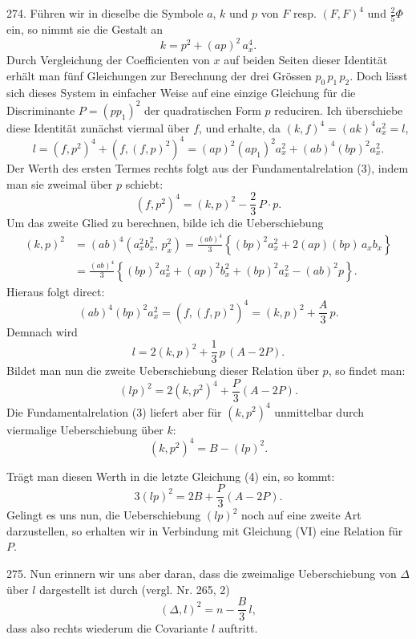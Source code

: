 \documentclass[11pt]{article}
\providecommand{\weberpage}[1]{}
\providecommand{\weq}[2]{\begin{equation}\tag{#1}#2\end{equation}}
\let\Delta\varDelta
\let\Phi\varPhi
\begin{document}
274. Führen wir in dieselbe die Symbole $a$, $k$ und $p$ von $F$ resp. $(F,F)^4$ und $\frac{2}{5}\Phi$ ein, so nimmt sie die Gestalt an
\weq{3}{
k = p^2 + (ap)^2\,a_x^4.
}
Durch Vergleichung der Coefficienten von $x$ auf beiden Seiten dieser Identität erhält man fünf Gleichungen zur Berechnung der drei Grössen $p_0\,p_1\,p_2$. Doch lässt sich dieses System in einfacher Weise auf eine einzige Gleichung für die Discriminante $P=(pp_1)^2$ der quadratischen Form $p$ reduciren. Ich überschiebe diese Identität zunächst viermal über $f$, und erhalte, da $(k,f)^4=(ak)^4 a_x^2=l$,
\[
l = (f,p^2)^4 + (f,(f,p)^2)^4 = (ap)^2(ap_1)^2 a_x^2 + (ab)^4(bp)^2 a_x^2.
\]
Der Werth des ersten Termes rechts folgt aus der Fundamentalrelation (3), indem man sie zweimal über $p$ schiebt:
\[
(f,p^2)^4 = (k,p)^2 - \frac{2}{3}\,P\cdot p.
\]
Um das zweite Glied zu berechnen, bilde ich die Ueberschiebung
\[
\begin{aligned}
(k,p)^2 &= (ab)^4(a_x^2 b_x^2,\, p_x^2) = \frac{(ab)^4}{3}\left\{ (bp)^2 a_x^2 + 2(ap)(bp)\,a_x b_x \right\} \\
&= \frac{(ab)^4}{3}\left\{ (bp)^2 a_x^2 + (ap)^2 b_x^2 + (bp)^2 a_x^2 - (ab)^2 p \right\}.
\end{aligned}
\]
Hieraus folgt direct:
\[
(ab)^4(bp)^2 a_x^2 = (f,(f,p)^2)^4 = (k,p)^2 + \frac{A}{3}\,p.
\]
Demnach wird
\weq{V}{
l = 2(k,p)^2 + \frac{1}{3}\,p\,(A - 2P).
}
Bildet man nun die zweite Ueberschiebung dieser Relation über $p$, so findet man:
\weq{4}{
(lp)^2 = 2(k,p^2)^4 + \frac{P}{3}(A-2P).
}
Die Fundamentalrelation (3) liefert aber für $(k,p^2)^4$ unmittelbar durch viermalige Ueberschiebung über $k$:
\[
(k,p^2)^4 = B - (lp)^2.
\]


\weberpage{299}
Trägt man diesen Werth in die letzte Gleichung (4) ein, so kommt:
\weq{VI}{
3(lp)^2 = 2B + \frac{P}{3}(A-2P).
}
Gelingt es uns nun, die Ueberschiebung $(lp)^2$ noch auf eine zweite Art darzustellen, so erhalten wir in Verbindung mit Gleichung (VI) eine Relation für $P$.

275. Nun erinnern wir uns aber daran, dass die zweimalige Ueberschiebung von $\Delta$ über $l$ dargestellt ist durch (vergl. Nr. 265, 2)
\[
(\Delta,l)^2 = n - \frac{B}{3}\,l,
\]
dass also rechts wiederum die Covariante $l$ auftritt.
\end{document}
